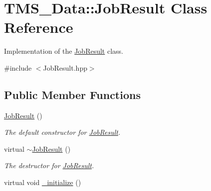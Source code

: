 \hypertarget{classTMS__Data_1_1JobResult}{
\section{TMS\_\-Data::JobResult Class Reference}
\label{classTMS__Data_1_1JobResult}
}


Implementation of the \hyperlink{classTMS__Data_1_1JobResult}{JobResult} class.  




{\ttfamily \#include $<$JobResult.hpp$>$}

\subsection*{Public Member Functions}
\begin{DoxyCompactItemize}
\item 
\hypertarget{classTMS__Data_1_1JobResult_a47dd76352629f6a1dd44e95fdb3854be}{
\hyperlink{classTMS__Data_1_1JobResult_a47dd76352629f6a1dd44e95fdb3854be}{JobResult} ()}
\label{classTMS__Data_1_1JobResult_a47dd76352629f6a1dd44e95fdb3854be}

\begin{DoxyCompactList}\small\item\em The default constructor for \hyperlink{classTMS__Data_1_1JobResult}{JobResult}. \item\end{DoxyCompactList}\item 
\hypertarget{classTMS__Data_1_1JobResult_ae487a0bb122f4d8555dd4316d5de645c}{
virtual \hyperlink{classTMS__Data_1_1JobResult_ae487a0bb122f4d8555dd4316d5de645c}{$\sim$JobResult} ()}
\label{classTMS__Data_1_1JobResult_ae487a0bb122f4d8555dd4316d5de645c}

\begin{DoxyCompactList}\small\item\em The destructor for \hyperlink{classTMS__Data_1_1JobResult}{JobResult}. \item\end{DoxyCompactList}\item 
\hypertarget{classTMS__Data_1_1JobResult_a486469cc6635c58796ecac674f9dc1ca}{
virtual void \hyperlink{classTMS__Data_1_1JobResult_a486469cc6635c58796ecac674f9dc1ca}{\_\-initialize} ()}
\label{classTMS__Data_1_1JobResult_a486469cc6635c58796ecac674f9dc1ca}


\end{DoxyCompactItemize}
